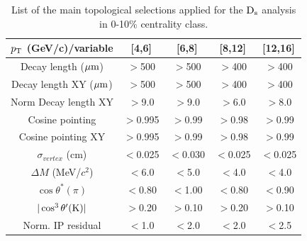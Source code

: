 \begin{table}[!h]
 \begin{center}
  \begin{tabular}{|c|c|c|c|c|}
\hline
$p_{\rm T}$ (GeV/c)/variable &  [4,6] & [6,8] & [8,12] & [12,16] \\
\hline
\hline
Decay length ($\mathrm{\mu m}$)        & $>$500 & $>$500 & $>$400 & $>$400\\
\hline
Decay length XY ($\mathrm{\mu m}$)     & $>$500 & $>$500 & $>$400 & $>$400\\
\hline
Norm Decay length XY          & $>$9.0 & $>$9.0 & $>$6.0 & $>$8.0\\
\hline
Cosine pointing              & $>$0.995 & $>$0.99 & $>$0.98 & $>$0.99\\
\hline
Cosine pointing XY        & $>$0.995 & $>$0.99 & $>$0.98 & $>$0.99\\
\hline
$\sigma_{vertex}$  (cm)          &  $<$0.025 & $<$0.030 & $<$0.025 & $<$0.025\\
\hline
$\Delta M$ (MeV/$c^{2}$) & $<$6.0 & $<$5.0 & $<$4.0 & $<$4.0\\
\hline
$\cos \theta^*(\pi)$    &$<$0.80 & $<$1.00 & $<$0.80 & $<$0.90\\
\hline
$|\cos^3 \theta^\prime({\rm K})|$        & $>$0.20 & $>$0.10 & $>$0.20 & $>$0.10\\
\hline
Norm. IP residual   & $<$1.0 & $<$2.0 & $<$2.0 & $<$2.5 \\
\hline
  \end{tabular}
 \caption{List of the main topological selections applied for the
   ${\rm D_s}$ analysis in 0-10\% centrality class.}
 \label{tab:topologicalselections_ds_010}
 \end{center}
\end{table} 

